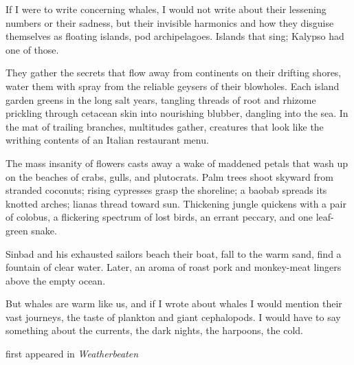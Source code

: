 
If I were to write concerning whales, I would not write about their
lessening numbers or their sadness, but their invisible harmonics and
how they disguise themselves as floating islands, pod archipelagoes.
Islands that sing; Kalypso had one of those.

They gather the secrets that flow away from continents on their drifting
shores, water them with spray from the reliable geysers of their
blowholes. Each island garden greens in the long salt years, tangling
threads of root and rhizome prickling through cetacean skin into
nourishing blubber, dangling into the sea. In the mat of trailing
branches, multitudes gather, creatures that look like the writhing
contents of an Italian restaurant menu.

The mass insanity of flowers casts away a wake of maddened petals that
wash up on the beaches of crabs, gulls, and plutocrats. Palm trees shoot
skyward from stranded coconuts; rising cypresses grasp the shoreline; a
baobab spreads its knotted arches; lianas thread toward sun. Thickening
jungle quickens with a pair of colobus, a flickering spectrum of lost
birds, an errant peccary, and one leaf-green snake.

Sinbad and his exhausted sailors beach their boat, fall to the warm
sand, find a fountain of clear water. Later, an aroma of roast pork and
monkey-meat lingers above the empty ocean.

But whales are warm like us, and if I wrote about whales I would mention
their vast journeys, the taste of plankton and giant cephalopods. I
would have to say something about the currents, the dark nights, the
harpoons, the cold.

first appeared in \emph{Weatherbeaten}
